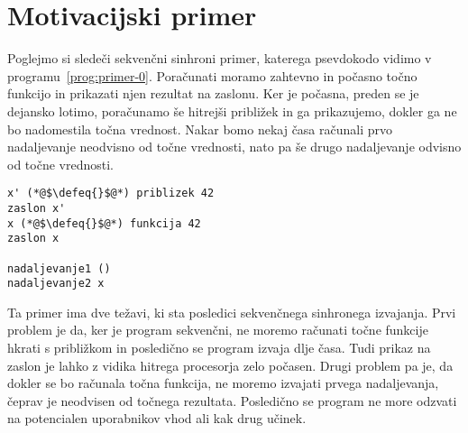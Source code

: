 \section{Motivacijski primer} \label{sec:primeri-aeff}

Poglejmo si sledeči sekvenčni sinhroni primer, katerega psevdokodo vidimo v programu~\ref{prog:primer-0}. Poračunati moramo zahtevno in počasno točno funkcijo in prikazati njen rezultat na zaslonu. Ker je počasna, preden se je dejansko lotimo, poračunamo še hitrejši približek in ga prikazujemo, dokler ga ne bo nadomestila točna vrednost. Nakar bomo nekaj časa računali prvo nadaljevanje neodvisno od točne vrednosti, nato pa še drugo nadaljevanje odvisno od točne vrednosti. 

\begin{lstlisting}[caption={Sinhron sekvečni primer.},label={prog:primer-0},floatplacement=H]
x' (*@$\defeq{}$@*) priblizek 42
zaslon x'
x (*@$\defeq{}$@*) funkcija 42
zaslon x

nadaljevanje1 ()
nadaljevanje2 x
\end{lstlisting}

Ta primer ima dve težavi, ki sta posledici sekvenčnega sinhronega izvajanja. Prvi problem je da, ker je program sekvenčni, ne moremo računati točne funkcije hkrati s približkom in posledično se program izvaja dlje časa. Tudi prikaz na zaslon je lahko z vidika hitrega procesorja zelo počasen. Drugi problem pa je, da dokler se bo računala točna funkcija, ne moremo izvajati prvega nadaljevanja, čeprav je neodvisen od točnega rezultata. Posledično se program ne more odzvati na potencialen uporabnikov vhod ali kak drug učinek.  

